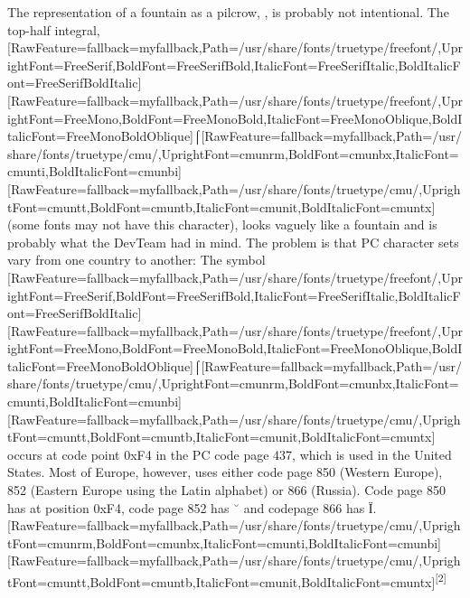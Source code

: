 The representation of a fountain as a pilcrow, , is probably not intentional. The top-{}half integral, \allowbreak{}\setmainfont{FreeSerif.ttf}[RawFeature={fallback=myfallback},Path=/usr/share/fonts/truetype/freefont/,UprightFont=FreeSerif,BoldFont=FreeSerifBold,ItalicFont=FreeSerifItalic,BoldItalicFont=FreeSerifBoldItalic]\setmonofont{FreeSerif.ttf}[RawFeature={fallback=myfallback},Path=/usr/share/fonts/truetype/freefont/,UprightFont=FreeMono,BoldFont=FreeMonoBold,ItalicFont=FreeMonoOblique,BoldItalicFont=FreeMonoBoldOblique]⌠\allowbreak{}\setmainfont{cmunrm.ttf}[RawFeature={fallback=myfallback},Path=/usr/share/fonts/truetype/cmu/,UprightFont=cmunrm,BoldFont=cmunbx,ItalicFont=cmunti,BoldItalicFont=cmunbi]\setmonofont{cmunrm.ttf}[RawFeature={fallback=myfallback},Path=/usr/share/fonts/truetype/cmu/,UprightFont=cmuntt,BoldFont=cmuntb,ItalicFont=cmunit,BoldItalicFont=cmuntx] (some fonts may not have this character), looks vaguely like a fountain and is probably what the DevTeam\footnotemark[37] had in mind. The problem is that PC character sets vary from one country to another: The symbol \allowbreak{}\setmainfont{FreeSerif.ttf}[RawFeature={fallback=myfallback},Path=/usr/share/fonts/truetype/freefont/,UprightFont=FreeSerif,BoldFont=FreeSerifBold,ItalicFont=FreeSerifItalic,BoldItalicFont=FreeSerifBoldItalic]\setmonofont{FreeSerif.ttf}[RawFeature={fallback=myfallback},Path=/usr/share/fonts/truetype/freefont/,UprightFont=FreeMono,BoldFont=FreeMonoBold,ItalicFont=FreeMonoOblique,BoldItalicFont=FreeMonoBoldOblique]⌠\allowbreak{}\setmainfont{cmunrm.ttf}[RawFeature={fallback=myfallback},Path=/usr/share/fonts/truetype/cmu/,UprightFont=cmunrm,BoldFont=cmunbx,ItalicFont=cmunti,BoldItalicFont=cmunbi]\setmonofont{cmunrm.ttf}[RawFeature={fallback=myfallback},Path=/usr/share/fonts/truetype/cmu/,UprightFont=cmuntt,BoldFont=cmuntb,ItalicFont=cmunit,BoldItalicFont=cmuntx] occurs at code point 0xF4 in the PC code page 437\footnotemark[38], which is used in the United States. Most of Europe, however, uses either code page 850\footnotemark[39] (Western Europe), 852\footnotemark[40] (Eastern Europe using the Latin alphabet) or 866\footnotemark[41] (Russia). Code page 850 has  at position 0xF4, code page 852 has ˘ and codepage 866 has Ї.\allowbreak{}\setmainfont{cmunrm.ttf}[RawFeature={fallback=myfallback},Path=/usr/share/fonts/truetype/cmu/,UprightFont=cmunrm,BoldFont=cmunbx,ItalicFont=cmunti,BoldItalicFont=cmunbi]\setmonofont{cmunrm.ttf}[RawFeature={fallback=myfallback},Path=/usr/share/fonts/truetype/cmu/,UprightFont=cmuntt,BoldFont=cmuntb,ItalicFont=cmunit,BoldItalicFont=cmuntx]\textsuperscript{{$\text{[}$}2{$\text{]}$}}


